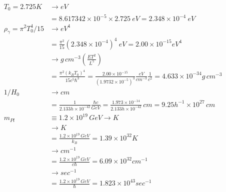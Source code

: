 \begin{align*}
    T_0 = 2.725K &\to eV\\ 
        &=8.617342 \times 10^{-5} \times 2.725\  eV = 2.348 \times 10 ^{-4} \ eV \\
    \rho_\gamma = \pi^2 T_0^4/15 &\to eV^4 \\
        & = \frac{\pi^2}{15} (2.348\times 10^{-4})^4\ eV = 2.00 \times 10 ^{-15}eV^4 \\
        & \to g\, cm^{-3}(\frac{ET^2}{L^5}) \\
        & =\frac{\pi^2(k_BT_0)^4}{15c^5\hbar^3} = \frac{2.00 \times 10 ^{-15}}{(1.9732 \times 10^{-5})^3} \frac{eV}{cm^{-3}}\frac{1}{c^2} = 4.633 \times 10^{-34}g\, cm^{-3}\\
    1/H_0 &\to cm \\
        & = \frac{1}{2.133h\times 10^{-42}}\frac{\hbar c}{GeV} = \frac{1.973\times 10 ^{-14}}{2.133h\times 10^{-42}}\, cm = 9.25h^{-1} \times 10^{27}\, cm\\
    m_{Pl} &\equiv 1.2\times 10 ^{19}\, GeV \to K\\
        &\to K\\
        & = \frac{1.2\times 10 ^{19}\, GeV}{k_B} = 1.39 \times 10 ^{32}K\\
        &\to cm^{-1}\\
        & = \frac{1.2\times 10 ^{19}\, GeV}{c\hbar} = 6.09\times 10 ^{32} cm^{-1}\\
        &\to sec^{-1}\\
        & = \frac{1.2\times 10 ^{19}\, GeV}{\hbar} = 1.823 \times 10^{43} sec^{-1}
\end{align*}